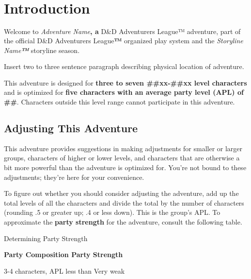 \section{}\label{section}

\section{\texorpdfstring{\\
}{ }}\label{section-1}

\section{Introduction}\label{introduction}

\protect\hypertarget{h.1fob9te}{}{}Welcome to \emph{Adventure
Name}\textbf{, a} D\&D Adventurers League™ adventure, part of the
official D\&D Adventurers League\textbf{™} organized play system and the
\emph{Storyline Name\textbf{™}} storyline season.

Insert two to three sentence paragraph describing physical location of
adventure.

This adventure is designed for \textbf{three to seven \#\#xx-\#\#xx
level characters} and is optimized for \textbf{five characters with an
average party level (APL) of \#\#}. Characters outside this level range
cannot participate in this adventure.

\subsection{Adjusting This Adventure}\label{adjusting-this-adventure}

This adventure provides suggestions in making adjustments for smaller or
larger groups, characters of higher or lower levels, and characters that
are otherwise a bit more powerful than the adventure is optimized for.
You're not bound to these adjustments; they're here for your
convenience.

To figure out whether you should consider adjusting the adventure, add
up the total levels of all the characters and divide the total by the
number of characters (rounding .5 or greater up; .4 or less down). This
is the group's APL. To approximate the \textbf{party strength} for the
adventure, consult the following table.

Determining Party Strength

\textbf{Party Composition Party Strength}

3-4 characters, APL less than Very weak

